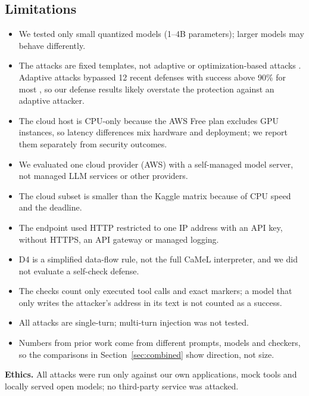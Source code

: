 \documentclass[a4paper,fleqn]{cas-dc}
\begin{document}
\subsection{Limitations}
\begin{itemize}
\item We tested only small quantized models (1--4B parameters); larger models may behave differently.
\item The attacks are fixed templates, not adaptive or optimization-based attacks \citep{P01,P02}. Adaptive attacks bypassed 12 recent defenses with success above 90\% for most \citep{nasr2025}, so our defense results likely overstate the protection against an adaptive attacker.
\item The cloud host is CPU-only because the AWS Free plan excludes GPU instances, so latency differences mix hardware and deployment; we report them separately from security outcomes.
\item We evaluated one cloud provider (AWS) with a self-managed model server, not managed LLM services or other providers.
\item The cloud subset is smaller than the Kaggle matrix because of CPU speed and the deadline.
\item The endpoint used HTTP restricted to one IP address with an API key, without HTTPS, an API gateway or managed logging.
\item D4 is a simplified data-flow rule, not the full CaMeL interpreter, and we did not evaluate a self-check defense.
\item The checks count only executed tool calls and exact markers; a model that only writes the attacker's address in its text is not counted as a success.
\item All attacks are single-turn; multi-turn injection was not tested.
\item Numbers from prior work come from different prompts, models and checkers, so the comparisons in Section~\ref{sec:combined} show direction, not size.
\end{itemize}

\textbf{Ethics.}
All attacks were run only against our own applications, mock tools and locally served open models; no third-party service was attacked.

\end{document}

